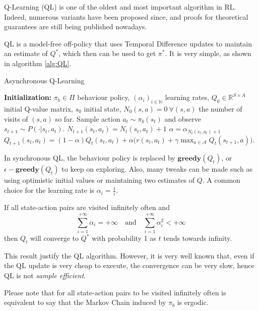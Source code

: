 Q-Learning (QL) is one of the oldest and most important algorithm in RL. Indeed, numerous variants have been proposed since, and proofs for theoretical guarantees are still being published nowadays.

QL is a model-free off-policy that uses Temporal Difference updates to maintain an estimate of $Q^*$, which then can be used to get $\pi^*$. It is very simple, as shown in algorithm \ref{alg:QL}.

\begin{algorithm}[htbp]
\small
\caption{Asynchronous Q-Learning}
\label{alg:QL}
\begin{algorithmic}
\State \textbf{Initialization:} $\pi_b \in \Pi$ behaviour policy, $(\alpha_i)_{i \in \mathbb{N}}$ learning rates, $Q_0 \in \mathbb{R}^{S \times A}$ initial Q-value matrix, $s_0$ initial state, $N_0(s,a) = 0 \ \forall (s,a)$ the number of visits of $(s,a)$ so far.
\State Sample action $a_t\sim \pi_b(s_t)$ and observe $s_{t+1}\sim P(\cdot\vert s_t,a_t)$.
\State $N_{t+1}(s_t,a_t)=N_t(s_t,a_t)+1$
\State $\alpha = \alpha_{N_t(s_t,a_t)+1}$
\State $Q_{t+1}(s_t,a_t)= (1-\alpha)Q_t(s_t,a_t)+\alpha\Big(r(s_t,a_t)+\gamma \max_{a\in\mathcal{A}}Q_t(s_{t+1},a)\Big)$.
\EndFor
\end{algorithmic}
\normalsize
\end{algorithm}

In synchronous QL, the behaviour policy is replaced by $\mathbf{greedy}(Q_t)$, or $\epsilon-\mathbf{greedy}(Q_t)$ to keep on exploring. Also, many tweaks can be made such as using optimistic initial values or maintaining two estimates of $Q$. A common choice for the learning rate is $\alpha_i = \frac{1}{i}$.

\begin{thm}
  If all state-action pairs are visited infinitely often and $$\sum_{i=1}^{+\infty}\alpha_i = +\infty \quad\text{and}\quad \sum_{i=1}^{+\infty}\alpha_i^2 < +\infty$$ then $Q_t$ will converge to $Q^*$ with probability 1 as $t$ tends towards infinity.
\end{thm}

This result justify the QL algorithm. However, it is very well known that, even if the QL update is very cheap to execute, the convergence can be very slow, hence QL is not \emph{sample efficient}.

Please note that for all state-action pairs to be visited infinitely often is equivalent to say that the Markov Chain induced by $\pi_b$ is ergodic.
